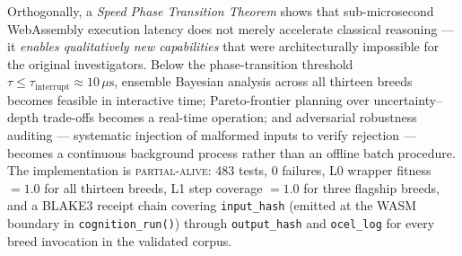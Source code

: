 Orthogonally, a \emph{Speed Phase Transition Theorem} shows that sub-microsecond
WebAssembly execution latency does not merely accelerate classical reasoning — it
\emph{enables qualitatively new capabilities} that were architecturally impossible for the
original investigators. Below the phase-transition threshold $\tau \leq \tau_{\text{interrupt}} \approx 10\,\mu\text{s}$,
ensemble Bayesian analysis across all thirteen breeds becomes feasible in interactive time;
Pareto-frontier planning over uncertainty--depth trade-offs becomes a real-time operation;
and adversarial robustness auditing — systematic injection of malformed inputs to verify
rejection — becomes a continuous background process rather than an offline batch procedure.
The implementation is \textsc{partial-alive}: 483 tests, 0 failures, L0 wrapper fitness
$= 1.0$ for all thirteen breeds, L1 step coverage $= 1.0$ for three flagship breeds, and a BLAKE3 receipt chain covering \texttt{input\_hash} (emitted at the WASM
boundary in \texttt{cognition\_run()}) through \texttt{output\_hash} and
\texttt{ocel\_log} for every breed invocation in the validated corpus.

